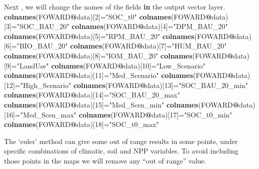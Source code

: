 \documentclass[
  10pt,
  b5paper,
]{book}
\newenvironment{Shaded}{\begin{snugshade}}{\end{snugshade}}
\newcommand{\ControlFlowTok}[1]{\textcolor[rgb]{0.13,0.29,0.53}{\textbf{#1}}}
\newcommand{\DecValTok}[1]{\textcolor[rgb]{0.00,0.00,0.81}{#1}}
\newcommand{\KeywordTok}[1]{\textcolor[rgb]{0.13,0.29,0.53}{\textbf{#1}}}
\newcommand{\NormalTok}[1]{#1}
\newcommand{\OperatorTok}[1]{\textcolor[rgb]{0.81,0.36,0.00}{\textbf{#1}}}
\newcommand{\StringTok}[1]{\textcolor[rgb]{0.31,0.60,0.02}{#1}}
\begin{document}
\begin{Shaded}
\begin{Highlighting}[]
\NormalTok{Next , we will change the names of the fields }\ControlFlowTok{in}\NormalTok{ the output vector layer.}
\KeywordTok{colnames}\NormalTok{(FOWARD}\OperatorTok{@}\NormalTok{data)[}\DecValTok{2}\NormalTok{]=}\StringTok{"SOC_t0"}
\KeywordTok{colnames}\NormalTok{(FOWARD}\OperatorTok{@}\NormalTok{data)[}\DecValTok{3}\NormalTok{]=}\StringTok{"SOC_BAU_20"}
\KeywordTok{colnames}\NormalTok{(FOWARD}\OperatorTok{@}\NormalTok{data)[}\DecValTok{4}\NormalTok{]=}\StringTok{"DPM_BAU_20"}
\KeywordTok{colnames}\NormalTok{(FOWARD}\OperatorTok{@}\NormalTok{data)[}\DecValTok{5}\NormalTok{]=}\StringTok{"RPM_BAU_20"}
\KeywordTok{colnames}\NormalTok{(FOWARD}\OperatorTok{@}\NormalTok{data)[}\DecValTok{6}\NormalTok{]=}\StringTok{"BIO_BAU_20"}
\KeywordTok{colnames}\NormalTok{(FOWARD}\OperatorTok{@}\NormalTok{data)[}\DecValTok{7}\NormalTok{]=}\StringTok{"HUM_BAU_20"}
\KeywordTok{colnames}\NormalTok{(FOWARD}\OperatorTok{@}\NormalTok{data)[}\DecValTok{8}\NormalTok{]=}\StringTok{"IOM_BAU_20"}
\KeywordTok{colnames}\NormalTok{(FOWARD}\OperatorTok{@}\NormalTok{data)[}\DecValTok{9}\NormalTok{]=}\StringTok{"LandUse"}
\KeywordTok{colnames}\NormalTok{(FOWARD}\OperatorTok{@}\NormalTok{data)[}\DecValTok{10}\NormalTok{]=}\StringTok{"Low_Scenario"}
\KeywordTok{colnames}\NormalTok{(FOWARD}\OperatorTok{@}\NormalTok{data)[}\DecValTok{11}\NormalTok{]=}\StringTok{"Med_Scenario"}
\KeywordTok{colnames}\NormalTok{(FOWARD}\OperatorTok{@}\NormalTok{data)[}\DecValTok{12}\NormalTok{]=}\StringTok{"High_Scenario"}
\KeywordTok{colnames}\NormalTok{(FOWARD}\OperatorTok{@}\NormalTok{data)[}\DecValTok{13}\NormalTok{]=}\StringTok{"SOC_BAU_20_min"}
\KeywordTok{colnames}\NormalTok{(FOWARD}\OperatorTok{@}\NormalTok{data)[}\DecValTok{14}\NormalTok{]=}\StringTok{"SOC_BAU_20_max"}
\KeywordTok{colnames}\NormalTok{(FOWARD}\OperatorTok{@}\NormalTok{data)[}\DecValTok{15}\NormalTok{]=}\StringTok{"Med_Scen_min"}
\KeywordTok{colnames}\NormalTok{(FOWARD}\OperatorTok{@}\NormalTok{data)[}\DecValTok{16}\NormalTok{]=}\StringTok{"Med_Scen_max"}
\KeywordTok{colnames}\NormalTok{(FOWARD}\OperatorTok{@}\NormalTok{data)[}\DecValTok{17}\NormalTok{]=}\StringTok{"SOC_t0_min"}
\KeywordTok{colnames}\NormalTok{(FOWARD}\OperatorTok{@}\NormalTok{data)[}\DecValTok{18}\NormalTok{]=}\StringTok{"SOC_t0_max"}
\end{Highlighting}
\end{Shaded}

The `euler' method can give some out of range results in some points, under specific combinations of climatic, soil and NPP variables. To avoid including those points in the maps we will remove any ``out of range'' value.
\end{document}
